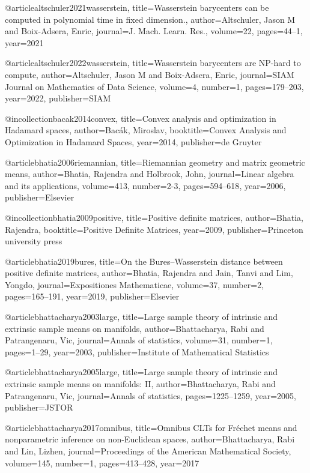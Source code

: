 @article{altschuler2021wasserstein,
  title={Wasserstein barycenters can be computed in polynomial time in fixed dimension.},
  author={Altschuler, Jason M and Boix-Adsera, Enric},
  journal={J. Mach. Learn. Res.},
  volume={22},
  pages={44--1},
  year={2021}
}

@article{altschuler2022wasserstein,
  title={Wasserstein barycenters are NP-hard to compute},
  author={Altschuler, Jason M and Boix-Adsera, Enric},
  journal={SIAM Journal on Mathematics of Data Science},
  volume={4},
  number={1},
  pages={179--203},
  year={2022},
  publisher={SIAM}
}

@incollection{bacak2014convex,
  title={Convex analysis and optimization in Hadamard spaces},
  author={Bac{\'a}k, Miroslav},
  booktitle={Convex Analysis and Optimization in Hadamard Spaces},
  year={2014},
  publisher={de Gruyter}
}

@article{bhatia2006riemannian,
  title={Riemannian geometry and matrix geometric means},
  author={Bhatia, Rajendra and Holbrook, John},
  journal={Linear algebra and its applications},
  volume={413},
  number={2-3},
  pages={594--618},
  year={2006},
  publisher={Elsevier}
}

@incollection{bhatia2009positive,
  title={Positive definite matrices},
  author={Bhatia, Rajendra},
  booktitle={Positive Definite Matrices},
  year={2009},
  publisher={Princeton university press}
}

@article{bhatia2019bures,
  title={On the Bures--Wasserstein distance between positive definite matrices},
  author={Bhatia, Rajendra and Jain, Tanvi and Lim, Yongdo},
  journal={Expositiones Mathematicae},
  volume={37},
  number={2},
  pages={165--191},
  year={2019},
  publisher={Elsevier}
}

@article{bhattacharya2003large,
  title={Large sample theory of intrinsic and extrinsic sample means on manifolds},
  author={Bhattacharya, Rabi and Patrangenaru, Vic},
  journal={Annals of statistics},
  volume={31},
  number={1},
  pages={1--29},
  year={2003},
  publisher={Institute of Mathematical Statistics}
}

@article{bhattacharya2005large,
  title={Large sample theory of intrinsic and extrinsic sample means on manifolds: {I}{I}},
  author={Bhattacharya, Rabi and Patrangenaru, Vic},
  journal={Annals of statistics},
  pages={1225--1259},
  year={2005},
  publisher={JSTOR}
}


@article{bhattacharya2017omnibus,
  title={Omnibus CLTs for {F}r{\'e}chet means and nonparametric inference on non-Euclidean spaces},
  author={Bhattacharya, Rabi and Lin, Lizhen},
  journal={Proceedings of the American Mathematical Society},
  volume={145},
  number={1},
  pages={413--428},
  year={2017}
}


